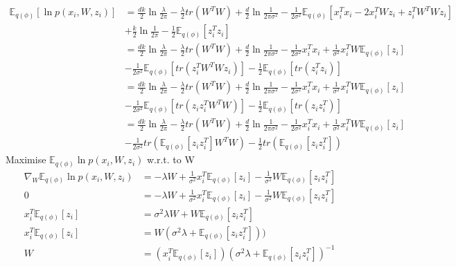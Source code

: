 \documentclass[twoside]{homework}
\begin{document}
\begin{align*}
\mathbb{E}_{q(\phi)} [\ln p(x_{i}, W, z_i)] 
&= \frac{dk}{2}\ln \frac{\lambda}{2\pi} - \frac{\lambda}{2} tr(W^T W)+ \frac{d}{2}\ln \frac{1}{2\pi \sigma^2} - \frac{1}{2 \sigma^2} \mathbb{E}_{q(\phi)} [x_i^T x_i - 2x_i^T Wz_i + z_i^T W^T W z_i] \\
&+ \frac{k}{2}\ln \frac{1}{2\pi} - \frac{1}{2} \mathbb{E}_{q(\phi)}[z_i^T z_i]\\
&= \frac{dk}{2}\ln \frac{\lambda}{2\pi} - \frac{\lambda}{2} tr(W^T W)+ \frac{d}{2}\ln \frac{1}{2\pi \sigma^2} - \frac{1}{2 \sigma^2} x_i^T x_i + \frac{1}{\sigma^2}x_i^T W\mathbb{E}_{q(\phi)}[z_i]\\
&- \frac{1}{2\sigma^2} \mathbb{E}_{q(\phi)}[tr(z_i^T W^T W z_i)] - \frac{1}{2} \mathbb{E}_{q(\phi)}[tr(z_i^T z_i)] \\
&= \frac{dk}{2}\ln \frac{\lambda}{2\pi} - \frac{\lambda}{2} tr(W^T W)+ \frac{d}{2}\ln \frac{1}{2\pi \sigma^2} - \frac{1}{2 \sigma^2} x_i^T x_i + \frac{1}{\sigma^2}x_i^T W\mathbb{E}_{q(\phi)}[z_i]\\
&- \frac{1}{2\sigma^2} \mathbb{E}_{q(\phi)}[tr(z_i z_i^T W^T W)] - \frac{1}{2} \mathbb{E}_{q(\phi)}[tr(z_i z_i^T )]\\
&= \frac{dk}{2}\ln \frac{\lambda}{2\pi} - \frac{\lambda}{2} tr(W^T W)+ \frac{d}{2}\ln \frac{1}{2\pi \sigma^2} - \frac{1}{2 \sigma^2} x_i^T x_i + \frac{1}{\sigma^2}x_i^T W\mathbb{E}_{q(\phi)}[z_i]\\
&- \frac{1}{2\sigma^2} tr(\mathbb{E}_{q(\phi)}[z_i z_i^T] W^T W) - \frac{1}{2} tr(\mathbb{E}_{q(\phi)}[z_i z_i^T])
\end{align*}
Maximise $\mathbb{E}_{q(\phi)} \ln p(x_{i}, W, z_i)$ w.r.t. to W
\begin{align*}
\nabla_W \mathbb{E}_{q(\phi)} \ln p(x_{i}, W, z_i)  
&= - {\lambda} W + \frac{1}{\sigma^2} x_i^T \mathbb{E}_{q(\phi)}[z_i] - \frac{1}{\sigma^2} W \mathbb{E}_{q(\phi)}[z_i z_i^T] \\
0
&= - {\lambda} W + \frac{1}{\sigma^2} x_i^T \mathbb{E}_{q(\phi)}[z_i] - \frac{1}{\sigma^2} W \mathbb{E}_{q(\phi)}[z_i z_i^T] \\
x_i^T \mathbb{E}_{q(\phi)}[z_i] 
&= \sigma^2 \lambda W + W \mathbb{E}_{q(\phi)}[z_i z_i^T] \\
x_i^T \mathbb{E}_{q(\phi)}[z_i]
&=  W (\sigma^2 \lambda + \mathbb{E}_{q(\phi)}[z_i z_i^T])) \\
W
&= (x_i^T \mathbb{E}_{q(\phi)}[z_i])(\sigma^2 \lambda + \mathbb{E}_{q(\phi)}[z_i z_i^T])^{-1} \\
\end{align*}
\end{document}
